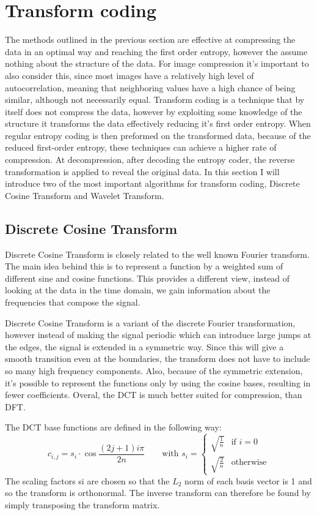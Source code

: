 \documentclass{diploma_style}
\begin{document}
\section{Transform coding}
The methods outlined in the previous section are effective at compressing the data in an optimal way and reaching the first order entropy, however the assume nothing about the structure of the data. For image compression it's important to also consider this, since most images have a relatively high level of autocorrelation, meaning that neighboring values have a high chance of being similar, although not necessarily equal. Transform coding is a technique that by itself does not compress the data, however by exploiting some knowledge of the structure it transforms the data effectively reducing it's first order entropy. When regular entropy coding is then preformed on the transformed data, because of the reduced first-order entropy, these techniques can achieve a higher rate of compression. At decompression, after decoding the entropy coder, the reverse transformation is applied to reveal the original data. In this section I will introduce two of the most important algorithms for transform coding, Discrete Cosine Transform and Wavelet Transform.
\subsection{Discrete Cosine Transform}
Discrete Cosine Transform \cite{ahmed_discrete_1974} is closely related to the well known Fourier transform. The main idea behind this is to represent a function by a weighted sum of different sine and cosine functions. This provides a different view, instead of looking at the data in the time domain, we gain information about the frequencies that compose the signal. 

Discrete Cosine Transform is a variant of the discrete Fourier transformation, however instead of making the signal periodic which can introduce large jumps at the edges, the signal is extended in a symmetric way. Since this will give a smooth transition even at the boundaries, the transform does not have to include so many high frequency components. Also, because of the symmetric extension, it's possible to represent the functions only by using the cosine bases, resulting in fewer coefficients. Overal, the DCT is much better suited for compression, than DFT.

The DCT base functions are defined in the following way:
\begin{equation}
c_{i,j} = s_i \cdot \cos \frac{(2j+1)i\pi}{2n} \qquad \text{with } s_i = 
	\begin{cases}
		\sqrt{\frac{1}{n}} & \text{if } i=0 \\
		\sqrt{\frac{2}{n}} & \text{otherwise}
	\end{cases}
\end{equation}
The scaling factors si are chosen so that the $L_2$ norm of each basis vector is 1 and
so the transform is orthonormal. The inverse transform can therefore be found by
simply transposing the transform matrix.
\end{document}
